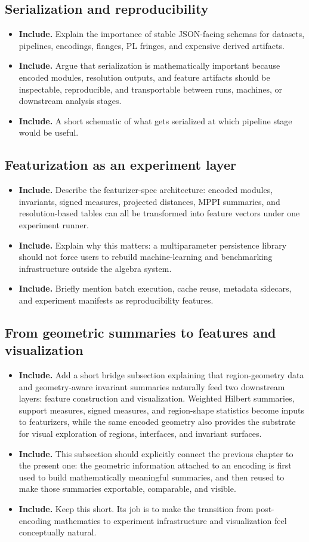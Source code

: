 \documentclass[11pt]{article}
\newenvironment{plan}{\begin{itemize}[leftmargin=1.6em,itemsep=0.35em,topsep=0.25em]}{\end{itemize}}
\newcommand{\includeitems}[1]{\item \textbf{Include.} #1}
\begin{document}
\subsection{Serialization and reproducibility}

\begin{plan}
    \includeitems{Explain the importance of stable JSON-facing schemas for datasets, pipelines, encodings, flanges, PL fringes, and expensive derived artifacts.}
    \includeitems{Argue that serialization is mathematically important because encoded modules, resolution outputs, and feature artifacts should be inspectable, reproducible, and transportable between runs, machines, or downstream analysis stages.}
    \includeitems{A short schematic of what gets serialized at which pipeline stage would be useful.}
\end{plan}

\subsection{Featurization as an experiment layer}

\begin{plan}
    \includeitems{Describe the featurizer-spec architecture: encoded modules, invariants, signed measures, projected distances, MPPI summaries, and resolution-based tables can all be transformed into feature vectors under one experiment runner.}
    \includeitems{Explain why this matters: a multiparameter persistence library should not force users to rebuild machine-learning and benchmarking infrastructure outside the algebra system.}
    \includeitems{Briefly mention batch execution, cache reuse, metadata sidecars, and experiment manifests as reproducibility features.}
\end{plan}



\subsection{From geometric summaries to features and visualization}

\begin{plan}
    \includeitems{Add a short bridge subsection explaining that region-geometry data and geometry-aware invariant summaries naturally feed two downstream layers: feature construction and visualization. Weighted Hilbert summaries, support measures, signed measures, and region-shape statistics become inputs to featurizers, while the same encoded geometry also provides the substrate for visual exploration of regions, interfaces, and invariant surfaces.}
    \includeitems{This subsection should explicitly connect the previous chapter to the present one: the geometric information attached to an encoding is first used to build mathematically meaningful summaries, and then reused to make those summaries exportable, comparable, and visible.}
    \includeitems{Keep this short. Its job is to make the transition from post-encoding mathematics to experiment infrastructure and visualization feel conceptually natural.}
\end{plan}
\end{document}
